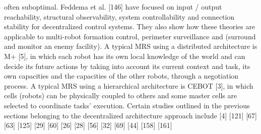 often suboptimal. Feddema et al. [146] have focused on
input / output reachability, structural observability,
system controllability and connection stability for
decentralized control systems. They also show how these
theories are applicable to multi-robot formation control,
perimeter surveillance and (surround and monitor an
enemy facility). A typical MRS using a distributed
architecture is M+ [5], in which each robot has its own
local knowledge of the world and can decide its future
actions by taking into account its current context and
task, its own capacities and the capacities of the other
robots, through a negotiation process. A typical MRS
using a hierarchical architecture is CEBOT [3], in which
cells (robots) can be physically coupled to others and
some master cells are selected to coordinate tasks’
execution. Certain studies outlined in the previous
sections belonging to the decentralized architecture
approach include [4] [121] [67] [63] [125] [29] [60] [26] [28]
[56] [32] [69] [44] [158] [161]
